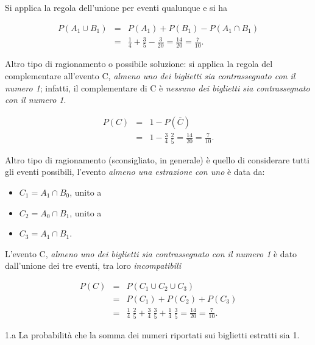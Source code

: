 \documentclass[
  11pt,
]{book}
\providecommand{\tightlist}{%
  \setlength{\itemsep}{0pt}\setlength{\parskip}{0pt}}
\theoremstyle{mytheoremstyle}
\theoremstyle{mydefstyle}
\newenvironment{sol}
  {
  \begin{tcolorbox}[enhanced,breakable,arc=0.1mm,boxrule=1pt,colback=white,colframe=iblue,
  title=\bf \fontfamily{lmss}\selectfont \hspace{.5 cm} Soluzione,drop fuzzy shadow]

}{
\end{tcolorbox}
  }
\begin{document}
\begin{sol}
Si applica la regola dell'unione per eventi qualunque e si ha

\begin{eqnarray*}
    P(A_1 \cup B_1)
&=& P(A_1)+P(B_1)-P(A_1\cap B_1) \\
&=& \frac{1}{4}+ \frac{3}{5}-\frac{3}{20}
 =  \frac{14}{20}
 =  \frac{7}{10}  .
\end{eqnarray*}

Altro tipo di ragionamento o possibile soluzione: si applica la
regola del complementare all'evento C, \emph{almeno uno dei biglietti sia contrassegnato con il numero 1};
infatti, il complementare di
C è \emph{nessuno dei biglietti sia contrassegnato con il numero 1}.

\begin{eqnarray*}
    P(C)
&=& 1 - P(\overline{C}) \\
&=& 1 - \frac{3}{4}\ \frac{2}{5}
 =  \frac{14}{20}
 =  \frac{7}{10}  .
\end{eqnarray*}

Altro tipo di ragionamento (sconsigliato, in generale) è quello
di considerare tutti gli eventi possibili, l'evento \emph{almeno una estrazione con uno} è data da:

\begin{itemize}
\tightlist
\item
  \(C_{1}=A_1 \cap B_0\), unito a
\item
  \(C_{2}=A_0 \cap B_1\), unito a
\item
  \(C_{3}=A_1 \cap B_1\).
\end{itemize}

L'evento C, \emph{almeno uno dei biglietti sia contrassegnato con il numero 1} è dato dall'unione dei tre eventi, tra loro
\emph{incompatibili}

\begin{eqnarray*}
    P(C)
&=& P(C_{1} \cup C_{2} \cup C_{3}) \\
&=& P(C_{1}) + P(C_{2}) + P(C_{3}) \\
&=& \frac{1}{4}\ \frac{2}{5} + \frac{3}{4}\ \frac{3}{5} +
    \frac{1}{4}\ \frac{3}{5}
 =  \frac{14}{20}
 =  \frac{7}{10}  .
\end{eqnarray*}

\end{sol}

1.a La probabilità che la somma dei numeri riportati sui
biglietti estratti sia 1.
\end{document}
